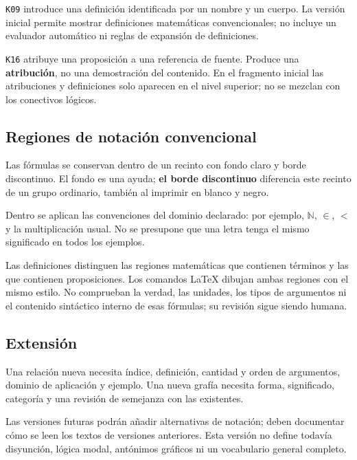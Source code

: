 \texttt{K09} introduce una definición identificada por un nombre y un cuerpo. La versión inicial permite mostrar definiciones matemáticas convencionales; no incluye un evaluador automático ni reglas de expansión de definiciones.

\texttt{K16} atribuye una proposición a una referencia de fuente. Produce una \textbf{atribución}, no una demostración del contenido. En el fragmento inicial las atribuciones y definiciones solo aparecen en el nivel superior; no se mezclan con los conectivos lógicos.

\subsection{Regiones de notación convencional}

Las fórmulas se conservan dentro de un recinto con fondo claro y borde discontinuo. El fondo es una ayuda; \textbf{el borde discontinuo} diferencia este recinto de un grupo ordinario, también al imprimir en blanco y negro.

Dentro se aplican las convenciones del dominio declarado: por ejemplo, \ensuremath{\mathbb{N}}, \ensuremath{\in}, \ensuremath{<} y la multiplicación usual. No se presupone que una letra tenga el mismo significado en todos los ejemplos.

Las definiciones distinguen las regiones matemáticas que contienen términos y las que contienen proposiciones. Los comandos LaTeX dibujan ambas regiones con el mismo estilo. No comprueban la verdad, las unidades, los tipos de argumentos ni el contenido sintáctico interno de esas fórmulas; su revisión sigue siendo humana.

\subsection{Extensión}

Una relación nueva necesita índice, definición, cantidad y orden de argumentos, dominio de aplicación y ejemplo. Una nueva grafía necesita forma, significado, categoría y una revisión de semejanza con las existentes.

Las versiones futuras podrán añadir alternativas de notación; deben documentar cómo se leen los textos de versiones anteriores. Esta versión no define todavía disyunción, lógica modal, antónimos gráficos ni un vocabulario general completo.
